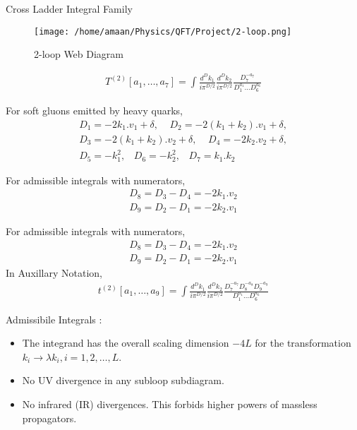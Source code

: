 \documentclass[11pt]{beamer}
\begin{document}
\begin{frame}{Cross Ladder Integral Family}
	\begin{figure}
		\centering
		\texttt{[image: /home/amaan/Physics/QFT/Project/2-loop.png]}
		\caption{ 2-loop Web Diagram}
		\label{fig:enter-label}
	\end{figure}
\begin{align*}
	T^{(2)}[a_1,\dots,a_7]=\int \frac{d^Dk_1}{i\pi^{D/2}}\frac{d^Dk_2}{i\pi^{D/2}}\frac{D_7^{-a_7}}{D_1^{a_1}\dots D_6^{a_6}}
\end{align*}

\end{frame}
\begin{frame}
For soft gluons emitted by heavy quarks,
\begin{align*}
	D_1=-2k_1.v_1+\delta, \;\;\;\;D_2=-2(k_1+k_2).v_1+\delta,\\ D_3=-2(k_1+k_2).v_2+\delta,\;\;\;\;
	D_4=-2k_2.v_2+\delta, \\
	D_5 = -k_1^2,\;\;\;D_6=-k_2^2, \;\;\;D_7=k_1.k_2
\end{align*}
\end{frame}
\begin{frame}
	For admissible integrals with numerators,
	\begin{align*}
		D_8=D_3-D_4=-2k_1.v_2\\
		D_9=D_2-D_1=-2k_2.v_1
	\end{align*}
\end{frame}
\begin{frame}
	For admissible integrals with numerators,
	\begin{align*}
		D_8=D_3-D_4=-2k_1.v_2\\
		D_9=D_2-D_1=-2k_2.v_1
	\end{align*}
	In Auxillary Notation,
	\begin{align*}
		t^{(2)}[a_1,\dots,a_9]=\int \frac{d^Dk_1}{i\pi^{D/2}}\frac{d^Dk_2}{i\pi^{D/2}}\frac{D_7^{-a_7}D_8^{-a_8}D_9^{-a_9}}{D_1^{a_1}\dots D_6^{a_6}}
	\end{align*}
\end{frame}
\begin{frame}
	Admissibile Integrals : 
	\begin{itemize}
		\item The integrand has the overall scaling dimension $-4L$ for the transformation $k_i\rightarrow \lambda k_i, i=1,2,\dots,L$.
		\item No UV divergence in any subloop subdiagram.
		\item  No infrared (IR) divergences. This forbids higher powers of massless propagators.
	\end{itemize} 
\end{frame}
\end{document}
